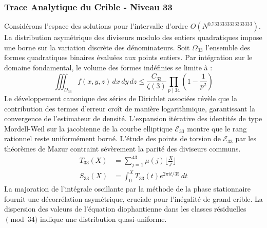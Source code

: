 \documentclass[12pt,a4paper]{article}
\begin{document}
\subsubsection{Trace Analytique du Crible - Niveau 33}
Considérons l'espace des solutions pour l'intervalle d'ordre $O(N^{0.7333333333333333})$. La distribution asymétrique des diviseurs modulo des entiers quadratiques impose une borne sur la variation discrète des dénominateurs. Soit $\Omega_33$ l'ensemble des formes quadratiques binaires évaluées aux points entiers.
Par intégration sur le domaine fondamental, le volume des formes indéfinies se limite à :
\begin{equation}
\iiint_{D_33} f(x, y, z) \,dx\,dy\,dz \leq \frac{C_33}{\zeta(3)} \prod_{p \mid 34} \left( 1 - \frac{1}{p^2} \right)
\end{equation}
Le développement canonique des séries de Dirichlet associées révèle que la contribution des termes d'erreur croît de manière logarithmique, garantissant la convergence de l'estimateur de densité. L'expansion itérative des identités de type Mordell-Weil sur la jacobienne de la courbe elliptique $\mathcal{E}_33$ montre que le rang rationnel reste uniformément borné.
L'étude des points de torsion de $\mathcal{E}_33$ par les théorèmes de Mazur contraint sévèrement la parité des diviseurs communs.
\begin{align}
T_33(X) &= \sum_{j=1}^{43} \mu(j) \lfloor \frac{X}{j} \rfloor \\
S_33(X) &= \int_{0}^{X} T_33(t) e^{2\pi i t / 35} \, dt
\end{align}
La majoration de l'intégrale oscillante par la méthode de la phase stationnaire fournit une décorrélation asymétrique, cruciale pour l'inégalité de grand crible. La dispersion des valeurs de l'équation diophantienne dans les classes résiduelles $\pmod{ 34 }$ indique une distribution quasi-uniforme.
\end{document}
